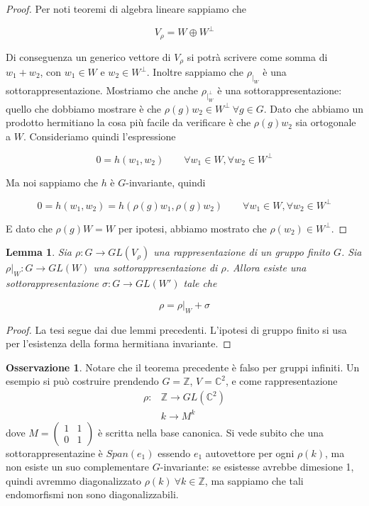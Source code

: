 \documentclass[11pt]{article}
\theoremstyle{plain}
\newtheorem{lemma}[thm]{Lemma}
\theoremstyle{definition}
\newtheorem*{rem}{Osservazione}
\theoremstyle{remark}
\newcommand{\C}{\mathbb{C}}
\newcommand{\Z}{\mathbb{Z}}
\begin{document}
\begin{proof}

Per noti teoremi di algebra lineare sappiamo che

\[ V_\rho = W \oplus W^\perp \]

Di conseguenza un generico vettore di $V_\rho$ si potrà scrivere come somma di $w_1 + w_2$, con $w_1 \in W$ e $w_2 \in W^\perp$. Inoltre sappiamo che $\rho_{|_W}$ è una sottorappresentazione. Mostriamo che anche $\rho_{|_W^\perp}$ è una sottorappresentazione: quello che dobbiamo mostrare è che $\rho(g) w_2 \in W^\perp \ \forall g \in G$. Dato che abbiamo un prodotto hermitiano la cosa più facile da verificare è che $\rho(g) w_2$ sia ortogonale a $W$. Consideriamo quindi l'espressione

\[ 0 = h(w_1, w_2) \qquad \forall w_1 \in W, \forall w_2 \in W^\perp\]

Ma noi sappiamo che $h$ è $G$-invariante, quindi

\[ 0 = h(w_1, w_2) = h(\rho(g) w_1, \rho(g) w_2) \qquad \forall w_1 \in W, \forall w_2 \in W^\perp \]

E dato che $\rho(g) W = W$ per ipotesi, abbiamo mostrato che $\rho(w_2) \in W^\perp$.
\end{proof}




\begin{lemma}
Sia $\rho: G \to GL(V_\rho)$ una rappresentazione di un gruppo finito $G$. Sia $\rho|_W: G \to GL(W)$ una sottorappresentazione di $\rho$. Allora esiste una sottorappresentazione $\sigma: G \to GL(W')$ tale che

\[\rho = \rho|_W + \sigma \]
\end{lemma}


\begin{proof} La tesi segue dai due lemmi precedenti. L'ipotesi di gruppo finito si usa per l'esistenza della forma hermitiana invariante.
\end{proof}



\begin{rem} Notare che il teorema precedente è falso per gruppi infiniti. Un esempio si può costruire prendendo $G=\Z$, $V=\C^2$, e come rappresentazione
\begin{align*}
	\rho:&\Z\to GL(\C^2)\\
	&k\to M^k
\end{align*}
dove $M=\begin{pmatrix}
        	1 & 1\\
        	0 & 1
        \end{pmatrix}$ è scritta nella base canonica.\newline
Si vede subito che una sottorappresentazine è $Span(e_1)$ essendo $e_1$ autovettore per ogni $\rho(k)$, ma non esiste un suo complementare $G$-invariante: se esistesse avrebbe dimesione 1, quindi avremmo diagonalizzato $\rho(k)\ \forall k\in \Z$, ma sappiamo che tali endomorfismi non sono diagonalizzabili.
\end{rem}
\end{document}
